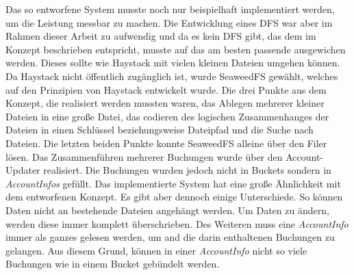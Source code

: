 \documentclass[12pt,oneside,a4paper,parskip]{scrbook}
\begin{document}
Das so entworfene System musste noch nur beispielhaft implementiert werden, um die Leistung messbar zu machen. Die Entwicklung eines DFS war aber im Rahmen dieser Arbeit zu aufwendig und da es kein DFS gibt, das dem im Konzept beschrieben entspricht, musste auf das am besten passende ausgewichen werden. Dieses sollte wie Haystack mit vielen kleinen Dateien umgehen können. Da Haystack nicht öffentlich zugänglich ist, wurde SeaweedFS gewählt, welches auf den Prinzipien von Haystack entwickelt wurde. Die drei Punkte aus dem Konzept, die realisiert werden mussten waren, das Ablegen mehrerer kleiner Dateien in eine große Datei, das codieren des logischen Zusammenhanges der Dateien in einen Schlüssel beziehungsweise Dateipfad und die Suche nach Dateien. Die letzten beiden Punkte konnte SeaweedFS alleine über den Filer lösen. Das Zusammenführen mehrerer Buchungen wurde über den Account-Updater realisiert. Die Buchungen wurden jedoch nicht in Buckets sondern in \textit{AccountInfos} gefüllt. Das implementierte System hat eine große Ähnlichkeit mit dem entworfenen Konzept. Es gibt aber dennoch einige Unterschiede. So können Daten nicht an bestehende Dateien angehängt werden. Um Daten zu ändern, werden diese immer komplett überschrieben. Des Weiteren muss eine \textit{AccountInfo} immer als ganzes gelesen werden, um  and die darin enthaltenen Buchungen zu gelangen. Aus diesem Grund, können in einer \textit{AccountInfo} nicht so viele Buchungen wie in einem Bucket gebündelt werden. 
\end{document}

